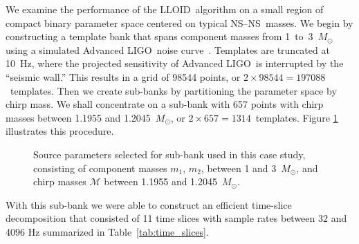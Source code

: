 \documentclass[preprint2]{aastex}
\newcommand{\NS}{NS}
\newcommand{\LIGO}{LIGO}%
\newcommand{\lloid}{LLOID}%
\begin{document}
We examine the performance of the \lloid\ algorithm on a small region of
compact binary parameter space centered on typical \NS--\NS\
masses.  We begin by constructing a template bank that spans component masses
from 1~to~3~$M_\odot$ using a simulated Advanced \LIGO\ noise
curve~\citep{ALIGONoise}.  Templates are truncated at 10~Hz, where the projected
sensitivity of Advanced \LIGO\ is interrupted by the ``seismic wall.''
This results in a grid of 98544 points, or
$2 \times 98544 = 197088$~templates.  Then we create sub-banks by partitioning
the parameter space by chirp mass.  We shall concentrate on a sub-bank with 657 points with
chirp masses between 1.1955 and 1.2045~$M_\odot$, or $2 \times 657 = 1314$~templates.
Figure \ref{fig:tmpltbank} illustrates this procedure.
\begin{figure}[h]
	\caption{\label{fig:tmpltbank}Source parameters selected for sub-bank used in this
case study, consisting of component masses $m_1$, $m_2$, between 1 and 3~$M_\odot$, and
chirp masses $\mathcal{M}$ between 1.1955 and 1.2045~$M_\odot$.}
\end{figure}
With this sub-bank we were able to construct an efficient time-slice decomposition
that consisted of 11 time slices with sample rates between 32 and 4096 Hz summarized
in Table~\ref{tab:time_slices}.
\end{document}
